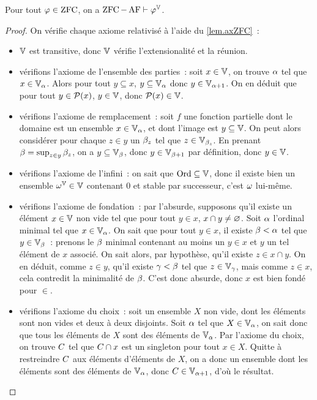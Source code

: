 \begin{theorem}\label{thm.V.ZFCAF}
  Pour tout $\varphi \in \operatorname{ZFC}$, on a $\operatorname{ZFC} - \operatorname{AF} \vdash \varphi^\mathbb V$.
\end{theorem}

\begin{proof}
  On vérifie chaque axiome relativisé à l'aide du \cref{lem.axZFC}~:
  \begin{itemize}
  \item $\mathbb V$ est transitive, donc $\mathbb V$ vérifie l'extensionalité et la réunion.
  \item vérifions l'axiome de l'ensemble des parties~: soit $x\in \mathbb V$,
    on trouve $\alpha$ tel que $x \in\mathbb V_{\alpha}$. Alors pour tout $y\subseteq x$,
    $y\subseteq \mathbb V_{\alpha}$ donc $y\in\mathbb V_{\alpha +1}$. On en déduit que pour tout
    $y\in \mathcal{P}(x)$, $y\in \mathbb V$, donc $\mathcal{P}(x)\in\mathbb V$.
  \item vérifions l'axiome de remplacement~: soit $f$ une fonction partielle
    dont le domaine est un ensemble $x \in \mathbb V_{\alpha}$, et dont l'image est
    $y \subseteq \mathbb V$. On peut alors considérer pour chaque $z \in y$ un
    $\beta_z$ tel que $z \in \mathbb V_{\beta_z}$. En prenant
    $\beta = \sup_{z\in y} \beta_z$, on a $y \subseteq \mathbb V_\beta$, donc
    $y\in \mathbb V_{\beta + 1}$ par définition, donc $y \in \mathbb V$.
  \item vérifions l'axiome de l'infini~: on sait que $\operatorname{Ord}\subseteq\mathbb V$, donc il
    existe bien un ensemble $\omega^\mathbb V \in \mathbb V$
    contenant $0$ et stable par successeur, c'est $\omega$ lui-même.
  \item vérifions l'axiome de fondation~: par l'absurde, supposons qu'il existe
    un élément $x \in \mathbb V$ non vide tel que pour tout $y \in x$,
    $x \cap y \neq \varnothing$. Soit $\alpha$ l'ordinal minimal tel que
    $x \in \mathbb V_\alpha$. On sait que pour tout $y \in x$, il existe
    $\beta < \alpha$ tel que $y \in \mathbb V_\beta$~: prenons le $\beta$ minimal
    contenant au moins un $y \in x$ et $y$ un tel élément de $x$ associé. On
    sait alors, par hypothèse, qu'il existe $z \in x \cap y$. On en déduit,
    comme $z \in y$, qu'il existe $\gamma < \beta$ tel que
    $z \in \mathbb V_\gamma$, mais comme $z \in x$, cela contredit la minimalité
    de $\beta$. C'est donc absurde, donc $x$ est bien fondé pour $\in$.
  \item vérifions l'axiome du choix~: soit un ensemble $X$ non vide, dont les
    éléments sont non vides et deux à deux disjoints. Soit $\alpha$ tel que
    $X \in \mathbb V_{\alpha}$, on sait donc que tous les éléments de $X$ sont
    des éléments de $\mathbb V_{\alpha}$. Par l'axiome du choix, on trouve
    $C$ tel que $C \cap x$ est un singleton pour tout $x \in X$.
    Quitte à restreindre $C$ aux éléments d'éléments de $X$, on a donc un
    ensemble dont les éléments sont des éléments de $\mathbb V_{\alpha}$, donc
    $C\in\mathbb V_{\alpha + 1}$, d'où le résultat.\qedhere
  \end{itemize}
\end{proof}

